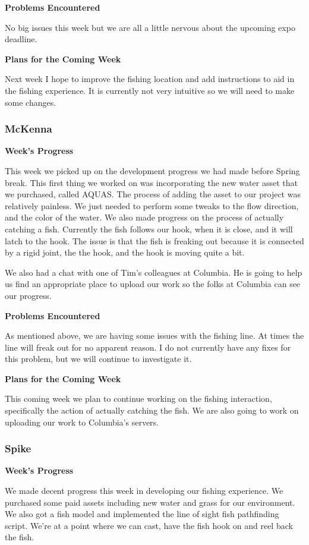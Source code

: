 \documentclass[10pt,journal,compsoc,onecolumn, draftclsnofoot]{IEEEtran}
\begin{document}
\noindent \textbf{Problems Encountered}

No big issues this week but we are all a little nervous about the upcoming expo deadline.

\noindent \textbf{Plans for the Coming Week}

Next week I hope to improve the fishing location and add instructions to aid in the fishing experience. It is currently not very intuitive so we will need to make some changes.

\subsubsection{McKenna}
\noindent \textbf{Week's Progress}

This week we picked up on the development progress we had made before Spring break. This first thing we worked on was incorporating the new water asset that we purchased, called AQUAS. The process of adding the asset to our project was relatively painless. We just needed to perform some tweaks to the flow direction, and the color of the water. We also made progress on the process of actually catching a fish. Currently the fish follows our hook, when it is close, and it will latch to the hook. The issue is that the fish is freaking out because it is connected by a rigid joint, the the hook, and the hook is moving quite a bit.

We also had a chat with one of Tim's colleagues at Columbia. He is going to help us find an appropriate place to upload our work so the folks at Columbia can see our progress.

\noindent \textbf{Problems Encountered}

As mentioned above, we are having some issues with the fishing line. At times the line will freak out for no apparent reason. I do not currently have any fixes for this problem, but we will continue to investigate it.

\noindent \textbf{Plans for the Coming Week}

This coming week we plan to continue working on the fishing interaction, specifically the action of actually catching the fish. We are also going to work on uploading our work to Columbia's servers.

\subsubsection{Spike}
\noindent \textbf{Week's Progress}

We made decent progress this week in developing our fishing experience. We purchased some paid assets including new water and grass for our environment. We also got a fish model and implemented the line of sight fish pathfinding script. We're at a point where we can cast, have the fish hook on and reel back the fish.
\end{document}
